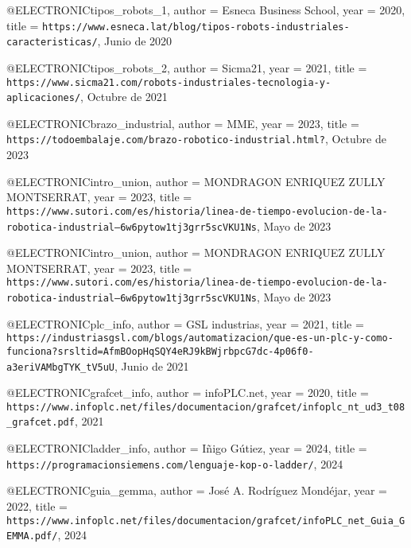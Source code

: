 @ELECTRONIC{tipos_robots_1,
  author = {{Esneca Business School}},
  year = {2020},
  title = {\texttt{https://www.esneca.lat/blog/tipos-robots-industriales-caracteristicas/}, {J}unio de 2020}
}

@ELECTRONIC{tipos_robots_2,
  author = {{Sicma21}},
  year = {2021},
  title = {\texttt{https://www.sicma21.com/robots-industriales-tecnologia-y-aplicaciones/}, {O}ctubre de 2021}
}

@ELECTRONIC{brazo_industrial,
  author = {{MME}},
  year = {2023},
  title = {\texttt{https://todoembalaje.com/brazo-robotico-industrial.html?}, {O}ctubre de 2023}
}

@ELECTRONIC{intro_union,
  author = {{MONDRAGON ENRIQUEZ ZULLY MONTSERRAT}},
  year = {2023},
  title = {\texttt{https://www.sutori.com/es/historia/linea-de-tiempo-evolucion-de-la-robotica-industrial--6w6pytow1tj3grr5scVKU1Ns}, {M}ayo de 2023}
}

@ELECTRONIC{intro_union,
  author = {{MONDRAGON ENRIQUEZ ZULLY MONTSERRAT}},
  year = {2023},
  title = {\texttt{https://www.sutori.com/es/historia/linea-de-tiempo-evolucion-de-la-robotica-industrial--6w6pytow1tj3grr5scVKU1Ns}, {M}ayo de 2023}
}

@ELECTRONIC{plc_info,
  author = {{GSL industrias}},
  year = {2021},
  title = {\texttt{https://industriasgsl.com/blogs/automatizacion/que-es-un-plc-y-como-funciona?srsltid=AfmBOopHqSQY4eRJ9kBWjrbpcG7dc-4p06f0-a3eriVAMbgTYK_tV5uU}, {J}unio de 2021}
}

@ELECTRONIC{grafcet_info,
  author = {{infoPLC.net}},
  year = {2020},
  title = {\texttt{https://www.infoplc.net/files/documentacion/grafcet/infoplc_nt_ud3_t08_grafcet.pdf}, 2021}
}

@ELECTRONIC{ladder_info,
  author = {{Iñigo Gútiez}},
  year = {2024},
  title = {\texttt{https://programacionsiemens.com/lenguaje-kop-o-ladder/}, 2024}
}

@ELECTRONIC{guia_gemma,
  author = {{José A. Rodríguez Mondéjar}},
  year = {2022},
  title = {\texttt{https://www.infoplc.net/files/documentacion/grafcet/infoPLC_net_Guia_GEMMA.pdf/}, 2024}
}

